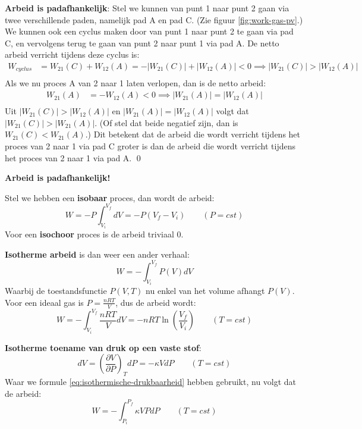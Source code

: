 \begin{derivation}
    \textbf{Arbeid is padafhankelijk}: Stel we kunnen van punt 1 naar punt 2 gaan via twee verschillende paden, namelijk pad A en pad C. (Zie figuur \ref{fig:work-gas-pv}.)
    We kunnen ook een cyclus maken door van punt 1 naar punt 2 te gaan via pad C, en vervolgens terug te gaan van punt 2 naar punt 1 via pad A. De netto arbeid verricht tijdens deze cyclus is:
    \begin{align*}
        W_{cyclus} &= W_{21}(C) + W_{12}(A)
        = -|W_{21}(C)| + |W_{12}(A)| < 0
        \implies |W_{21}(C)| > |W_{12}(A)| \\
    \end{align*}
    Als we nu proces A van 2 naar 1 laten verlopen, dan is de netto arbeid:
    \begin{align*}
        W_{21}(A) &= -W_{12}(A) <0 \implies |W_{21}(A)| = |W_{12}(A)| \\
    \end{align*}
    Uit \(|W_{21}(C)| > |W_{12}(A)|\) en \(|W_{21}(A)| = |W_{12}(A)|\) volgt dat \(|W_{21}(C)| > |W_{21}(A)|\). (Of stel dat beide negatief zijn, dan is \(W_{21}(C) < W_{21}(A)\).)
    Dit betekent dat de arbeid die wordt verricht tijdens het proces van 2 naar 1 via pad C groter is dan de arbeid die wordt verricht tijdens het proces van 2 naar 1 via pad A.
    \qed
\end{derivation}
\medskip
\begin{postulate}
    \textbf{Arbeid is padafhankelijk!}
\end{postulate}

Stel we hebben een  \textbf{isobaar} proces, dan wordt de arbeid:
\begin{equation}
\label{eq:isobare-arbeid}
W = -P \int_{V_i}^{V_f} dV = -P(V_f - V_i) \qquad (P = cst)
\end{equation}
Voor een  \textbf{isochoor} proces is de arbeid triviaal 0.

\textbf{Isotherme arbeid} is dan weer een ander verhaal:
\[
W = - \int_{V_i}^{V_f} P(V)dV
\]
Waarbij de toestandsfunctie \(P(V, T)\) nu enkel van het volume afhangt \(P(V)\).
Voor een ideaal gas is \(P = \frac{nRT}{V}\), dus de arbeid wordt:
\begin{equation}
\label{eq: isotherme-arbeid-ideaal-gas}
W = - \int_{V_i}^{V_f} \frac{nRT}{V}dV = -nRT \ln\left( \frac{V_f}{V_i} \right) \qquad (T = cst)
\end{equation}

\textbf{Isotherme toename van druk op een vaste stof}:
\[
dV = \left( \frac{\partial V}{\partial P} \right)_T dP = - \kappa V dP \qquad (T = cst)
\]
Waar we formule \eqref{eq:isothermische-drukbaarheid} hebben gebruikt, nu volgt dat de arbeid:
\begin{equation}
\label{eq: isotherme-arbeid-vast-stof}
W = - \int_{P_i}^{P_f} \kappa VP  dP \qquad (T = cst)
\end{equation}

